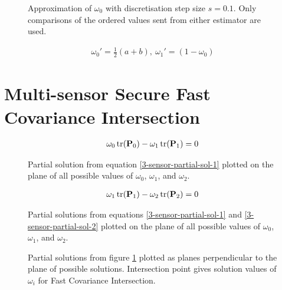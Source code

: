 \documentclass[letterpaper, 10 pt, conference]{ieeeconf}  %
\begin{document}
\begin{figure}[h]
   \begin{center}
      
   \end{center}
   \caption{Approximation of $\omega_0$ with discretisation step size $s=0.1$. Only comparisons of the ordered values sent from either estimator are used.}
\end{figure}

\begin{gather}
   \omega_0'=\frac{1}{2}(a + b),\ \omega_1' = (1-\omega_0)
\end{gather}

\section{Multi-sensor Secure Fast Covariance Intersection}
\begin{gather}
   \omega_0 \operatorname{tr}({{\mathbf{P}}}_0) - \omega_1 \operatorname{tr}({{\mathbf{P}}}_1) = 0 \label{3-sensor-partial-sol-1}
\end{gather}

\begin{figure}[h]
   \begin{center}
      
   \end{center}
   \caption{Partial solution from equation \ref{3-sensor-partial-sol-1} plotted on the plane of all possible values of $\omega_0$, $\omega_1$, and $\omega_2$.}
\end{figure}

\begin{gather}
   \omega_1 \operatorname{tr}({{\mathbf{P}}}_1) - \omega_2 \operatorname{tr}({{\mathbf{P}}}_2) = 0 \label{3-sensor-partial-sol-2}
\end{gather}

\begin{figure}[h]
   \begin{center}
      
   \end{center}
   \caption{Partial solutions from equations \ref{3-sensor-partial-sol-1} and \ref{3-sensor-partial-sol-2} plotted on the plane of all possible values of $\omega_0$, $\omega_1$, and $\omega_2$.}
   \label{3-sensor-partial-sols}
\end{figure}

\begin{figure}[h]
   \begin{center}
      
   \end{center}
   \caption{Partial solutions from figure \ref{3-sensor-partial-sols} plotted as planes perpendicular to the plane of possible solutions. Intersection point gives solution values of $\omega_i$ for Fast Covariance Intersection.}
\end{figure}
\end{document}
